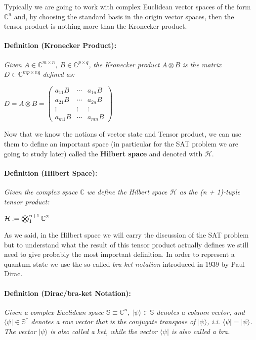 \documentclass[english]{article}
\newcommand{\sbigotimes}{%
	\mathop{\mathchoice{\textstyle\bigotimes}{\bigotimes}{\bigotimes}{\bigotimes}}%
}
\begin{document}
			Typically we are going to work with complex Euclidean vector spaces of the form $\mathbb{C}^n$ and, by choosing the standard basis in the origin vector spaces, then the tensor product is nothing more than the Kronecker product.
			
			\paragraph{Definition (Kronecker Product):} \emph{Given $A \in \mathbb{C}^{m\times n}$, $B \in \mathbb{C}^{p\times q}$, the Kronecker product $A \otimes B$ is the matrix $D \in \mathbb{C}^{mp\times nq}$ defined as:}
			\begin{center}
				$
				D = A\otimes B =
				\begin{pmatrix}
				a_{11}B & \cdots & a_{1n}B \\
				a_{21}B & \cdots  & a_{2n}B \\
				\vdots & \vdots & \vdots \\
				a_{m1}B & \cdots & a_{mn}B
				\end{pmatrix}
				$
			\end{center}
		
			Now that we know the notions of vector state and Tensor product, we can use them to define an important space (in particular for the SAT problem we are going to study later) called the \textbf{Hilbert space} and denoted with $\mathcal{H}$.
			
			\paragraph{Definition (Hilbert Space):} \emph{Given the complex space $\mathbb{C}$ we define the Hilbert space $\mathcal{H}$ as the (n + 1)-tuple tensor product:}
			\begin{center}
				$
				\mathcal{H} := \sbigotimes_1^{n+1} \mathbb{C}^{2}
				$
			\end{center}
		
			As we said, in the Hilbert space we will carry the discussion of the SAT problem but to understand what the result of this tensor product actually defines we still need to give probably the most important definition. In order to represent a quantum state we use the so called \emph{bra-ket notation} introduced in 1939 by Paul Dirac.
			
			\paragraph{Definition (Dirac/bra-ket Notation):} \emph{Given a complex Euclidean space $\mathbb{S} \equiv \mathbb{C}^{n}$, $|\psi\rangle \in \mathbb{S}$ denotes a column vector, and $\langle\psi| \in \mathbb{S}^{*}$ denotes a row vector that is the conjugate transpose of $|\psi\rangle$, i.i. $\langle\psi| = |\psi\rangle$. The vector $|\psi\rangle$ is also called a ket, while the vector $\langle\psi|$ is also called a bra.} \\
			
\end{document}
